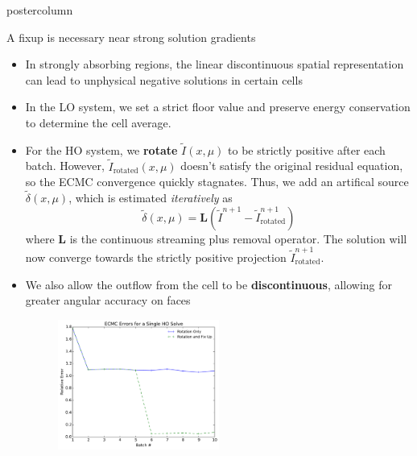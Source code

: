 \documentclass[xcolor=dvipsnames]{beamer}
\newcommand{\colb}[1]{{\color{blue} #1}}
\newcommand{\colr}[1]{{\color{red} #1}}
\begin{document}
\begin{frame}
\begin{columns}
\begin{column}{.49\textwidth}
\begin{beamercolorbox}[center,wd=\textwidth]{postercolumn}
\begin{minipage}[T]{0.95\textwidth}
{\begin{block}{A fixup is necessary near strong solution gradients}
        \begin{itemize}
        \setlength\itemsep{0.5em}
            \item In strongly absorbing regions, the linear discontinuous spatial
                representation can lead to \colr{unphysical negative solutions} in certain cells
            \item In the LO system,  we set a strict floor value and preserve energy
                conservation to determine the cell average.
            \item For the HO system, we \textbf{rotate} $\tilde{I}(x,\mu)$ to be strictly positive after
                each batch. However, $\tilde{I}_{\text{rotated}}(x,\mu)$ doesn't satisfy
                the original residual equation, so the ECMC convergence quickly
                \colr{stagnates}.  Thus, we add an artifical source
                $\tilde\delta(x,\mu)$, which is 
                estimated \emph{iteratively} as
                \begin{equation*}
                    \tilde\delta(x,\mu) = \mathbf{L}(\tilde{I}^{n+1} -
                    \tilde{I}^{n+1}_{\text{rotated}})
                \end{equation*}
                where $\mathbf{L}$ is the continuous streaming plus removal operator. The solution will now converge 
                towards the \colb{strictly positive} projection $\tilde{I}_{\text{rotated}}^{n+1}$.
            \item We also allow the outflow from the cell to be \textbf{discontinuous}, allowing for greater angular accuracy on faces
                \begin{figure}[H]
                \centering
                \includegraphics[width=0.5\textwidth]{errors.pdf}
             \end{figure}
        \end{itemize}
    \end{block}

}
\end{minipage}
\end{beamercolorbox}
\end{column}
\end{columns}
\end{frame}
\end{document}
